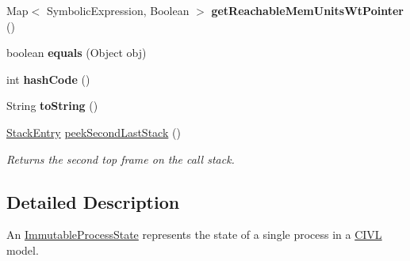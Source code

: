 \begin{DoxyCompactItemize}
\item 
\hypertarget{classedu_1_1udel_1_1cis_1_1vsl_1_1civl_1_1state_1_1common_1_1immutable_1_1ImmutableProcessState_a0cf9fe5996ba467a40bc625e7634624b}{}Map$<$ Symbolic\+Expression, Boolean $>$ {\bfseries get\+Reachable\+Mem\+Units\+Wt\+Pointer} ()\label{classedu_1_1udel_1_1cis_1_1vsl_1_1civl_1_1state_1_1common_1_1immutable_1_1ImmutableProcessState_a0cf9fe5996ba467a40bc625e7634624b}

\item 
\hypertarget{classedu_1_1udel_1_1cis_1_1vsl_1_1civl_1_1state_1_1common_1_1immutable_1_1ImmutableProcessState_afa593109592cde1ad830aa1bf76bb807}{}boolean {\bfseries equals} (Object obj)\label{classedu_1_1udel_1_1cis_1_1vsl_1_1civl_1_1state_1_1common_1_1immutable_1_1ImmutableProcessState_afa593109592cde1ad830aa1bf76bb807}

\item 
\hypertarget{classedu_1_1udel_1_1cis_1_1vsl_1_1civl_1_1state_1_1common_1_1immutable_1_1ImmutableProcessState_a4cea29dcf76cae8a0b46f7d91ce2f4f1}{}int {\bfseries hash\+Code} ()\label{classedu_1_1udel_1_1cis_1_1vsl_1_1civl_1_1state_1_1common_1_1immutable_1_1ImmutableProcessState_a4cea29dcf76cae8a0b46f7d91ce2f4f1}

\item 
\hypertarget{classedu_1_1udel_1_1cis_1_1vsl_1_1civl_1_1state_1_1common_1_1immutable_1_1ImmutableProcessState_a3993e3363e7bc7529c61cc1b135a7930}{}String {\bfseries to\+String} ()\label{classedu_1_1udel_1_1cis_1_1vsl_1_1civl_1_1state_1_1common_1_1immutable_1_1ImmutableProcessState_a3993e3363e7bc7529c61cc1b135a7930}

\item 
\hyperlink{interfaceedu_1_1udel_1_1cis_1_1vsl_1_1civl_1_1state_1_1IF_1_1StackEntry}{Stack\+Entry} \hyperlink{classedu_1_1udel_1_1cis_1_1vsl_1_1civl_1_1state_1_1common_1_1immutable_1_1ImmutableProcessState_a549b7ab395aabd5ae3172072adedb692}{peek\+Second\+Last\+Stack} ()
\begin{DoxyCompactList}\small\item\em Returns the second top frame on the call stack. \end{DoxyCompactList}\end{DoxyCompactItemize}


\subsection{Detailed Description}
An \hyperlink{classedu_1_1udel_1_1cis_1_1vsl_1_1civl_1_1state_1_1common_1_1immutable_1_1ImmutableProcessState}{Immutable\+Process\+State} represents the state of a single process in a \hyperlink{classedu_1_1udel_1_1cis_1_1vsl_1_1civl_1_1CIVL}{C\+I\+V\+L} model. 

